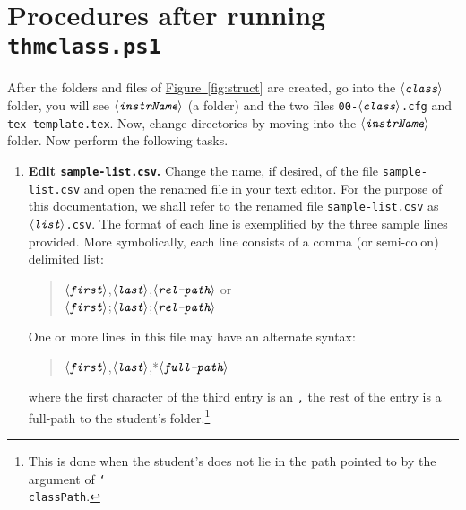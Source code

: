 \documentclass{article}
\def\cs#1{\texttt{\char`\\#1}}
\def\ameta#1{\ensuremath{\langle\textit{\texttt{#1}}\rangle}}
\begin{document}
\section{Procedures after running \texttt{thmclass.ps1}}

After the folders and files of
\hyperref[fig:struct]{Figure~\ref*{fig:struct}} are created, go
into the \ameta{class} folder, you will see \ameta{instrName} (a
folder) and the two files \texttt{00-\ameta{class}.cfg} and
\texttt{tex-template.tex}. Now, change directories by moving
into the \ameta{instrName} folder. Now perform the following
tasks.
\begin{enumerate}
  \item \textbf{Edit \texttt{sample-list.csv}.}\label{item:Editlist} Change the
      name, if desired, of the file \texttt{sample-list.csv}
      and open the renamed file in your text editor. For the
      purpose of this documentation, we shall refer to the
      renamed file \texttt{sample-list.csv} as
      \texttt{\ameta{list}.csv}. The format of each line is
      exemplified by the three sample lines provided. More
      symbolically, each line consists of a comma (or
      semi-colon) delimited list:
\begin{quote}
  \ameta{first},\ameta{last},\ameta{rel-path} or\\
  \ameta{first};\ameta{last};\ameta{rel-path}
\end{quote}
One or more lines in this file may have an alternate syntax:
\begin{quote}
  \ameta{first},\ameta{last},*\ameta{full-path}
\end{quote}
where the first character of the third entry is an \texttt*,
the rest of the entry is a full-path to the student's
folder.\footnote{This is done when the student's does not lie
in the path pointed to by the argument of \cs{classPath}.}


\end{enumerate}
\end{document}
